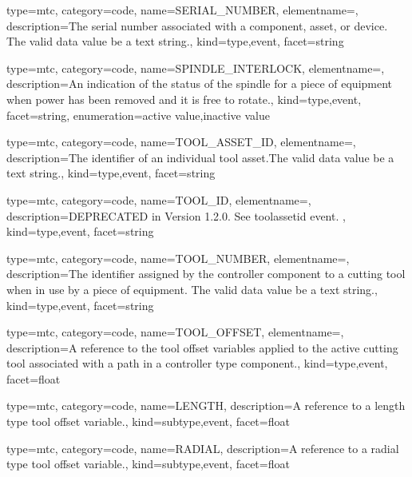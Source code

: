 {
  type=mtc,
  category=code,
  name={SERIAL\_NUMBER},
  elementname=,
  description={The serial number associated with a \gls{component}, \gls{asset}, or \gls{device}. The \gls{valid data value} \must be a text string.},
  kind={type,event},
  facet={\gls{string}}
}


{
  type=mtc,
  category=code,
  name={SPINDLE\_INTERLOCK},
  elementname=,
  description={An indication of the status of the spindle for a piece of equipment when power has been removed and it is free to rotate.},
  kind={type,event},
  facet={\gls{string}},
  enumeration={\gls{active value},\gls{inactive value}}
}


{
  type=mtc,
  category=code,
  name={TOOL\_ASSET\_ID},
  elementname=,
  description={The identifier of an individual tool asset.The \gls{valid data value} \must be a text string.},
  kind={type,event},
  facet={\gls{string}}
}


{
  type=mtc,
  category=code,
  name={TOOL\_ID},
  elementname=,
  description={DEPRECATED in Version 1.2.0.   See \gls{toolassetid event}. },
  kind={type,event},
  facet={\gls{string}}
}


{
  type=mtc,
  category=code,
  name={TOOL\_NUMBER},
  elementname=,
  description={The identifier assigned by the \gls{controller} component to a cutting tool when in use by a piece of equipment. \newline The \gls{valid data value} \must be a text string.},
  kind={type,event},
  facet={\gls{string}}
}


{
  type=mtc,
  category=code,
  name={TOOL\_OFFSET},
  elementname=,
  description={A reference to the tool offset variables applied to the active cutting tool associated with a \gls{path} in a \gls{controller} type component.},
  kind={type,event},
  facet={\gls{float}}
}


{
  type=mtc,
  category=code,
  name={LENGTH},
  description={A reference to a length type tool offset variable.},
  kind={subtype,event},
  facet={\gls{float}}
}


{
  type=mtc,
  category=code,
  name={RADIAL},
  description={A reference to a radial type tool offset variable.},
  kind={subtype,event},
  facet={\gls{float}}
}


